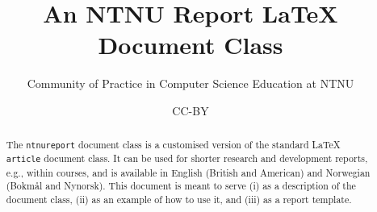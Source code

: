 \documentclass[british]{ntnureport}
\title{An NTNU Report \LaTeX{} Document Class}
\author{Community of Practice in Computer Science Education at NTNU}
\date{CC-BY \ntnureportdate}
\begin{document}
\begin{abstract}
    The \texttt{ntnureport} document class is a customised version of the standard \LaTeX{} \texttt{article} document class. It can be used for shorter research and development reports, e.g., within courses, and is available in English (British and American) and Norwegian (Bokmål and Nynorsk). This document is meant to serve (i) as a description of the document class, (ii) as an example of how to use it, and (iii) as a report template.
\end{abstract}






\printbibliography

\appendix


\end{document}
